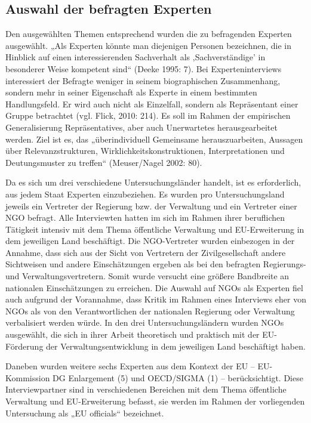 \subsection{Auswahl der befragten Experten}
Den ausgewählten Themen entsprechend wurden die zu befragenden Experten ausgewählt. „Als Experten könnte man diejenigen Personen bezeichnen, die in Hinblick auf einen interessierenden Sachverhalt als ‚Sachverständige’ in besonderer Weise kompetent sind“ (Deeke 1995: 7). Bei Experteninterviews interessiert der Befragte weniger in seinem biographischen Zusammenhang, sondern mehr in seiner Eigenschaft als Experte in einem bestimmten Handlungsfeld. Er wird auch nicht als Einzelfall, sondern als Repräsentant einer Gruppe betrachtet (vgl. Flick, 2010: 214). Es soll im Rahmen der empirischen Generalisierung Repräsentatives, aber auch Unerwartetes herausgearbeitet werden. Ziel ist es, das „überindividuell Gemeinsame herauszuarbeiten, Aussagen über Relevanzstrukturen, Wirklichkeitskonstruktionen, Interpretationen und Deutungsmuster zu treffen“ (Meuser/Nagel 2002: 80).\par
Da es sich um drei verschiedene Untersuchungsländer handelt, ist es erforderlich, aus jedem Staat Experten einzubeziehen. Es wurden pro Untersuchungsland jeweils ein Vertreter der Regierung bzw. der Verwaltung und ein Vertreter einer NGO befragt. Alle Interviewten hatten im sich im Rahmen ihrer beruflichen Tätigkeit intensiv mit dem Thema öffentliche Verwaltung und EU-Erweiterung in dem jeweiligen Land beschäftigt. Die NGO-Vertreter wurden einbezogen in der Annahme, dass sich aus der Sicht von Vertretern der Zivilgesellschaft andere Sichtweisen und andere Einschätzungen ergeben als bei den befragten Regierungs- und Verwaltungsvertretern. Somit wurde versucht eine größere Bandbreite an nationalen Einschätzungen zu erreichen. Die Auswahl auf NGOs als Experten fiel auch aufgrund der Vorannahme, dass Kritik im Rahmen eines Interviews eher von NGOs als von den Verantwortlichen der nationalen Regierung oder Verwaltung verbalisiert werden würde. In den drei Untersuchungsländern wurden NGOs ausgewählt, die sich in ihrer Arbeit theoretisch und praktisch mit der EU-Förderung der Verwaltungsentwicklung in dem jeweiligen Land beschäftigt haben.\par
Daneben wurden weitere sechs Experten aus dem Kontext der EU – EU-Kommission DG Enlargement (5) und OECD/SIGMA (1) – berücksichtigt. Diese Interviewpartner sind in verschiedenen Bereichen mit dem Thema öffentliche Verwaltung und EU-Erweiterung befasst, sie werden im Rahmen der vorliegenden Untersuchung als „EU officials“ bezeichnet.\par
